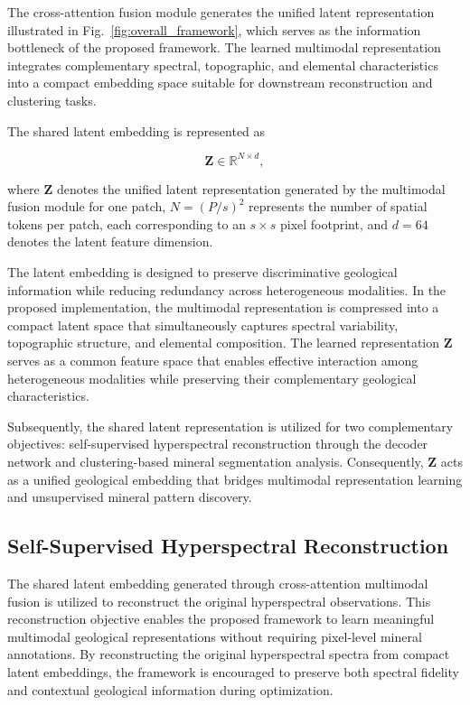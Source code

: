\documentclass[pdflatex,sn-mathphys-num]{sn-jnl}
\begin{document}
The cross-attention fusion module generates the unified latent representation illustrated in Fig.~\ref{fig:overall_framework}, which serves as the information bottleneck of the proposed framework. The learned multimodal representation integrates complementary spectral, topographic, and elemental characteristics into a compact embedding space suitable for downstream reconstruction and clustering tasks.

The shared latent embedding is represented as

\[
\mathbf{Z}\in\mathbb{R}^{N\times d},
\]

where $\mathbf{Z}$ denotes the unified latent representation generated by the multimodal fusion module for one patch, $N=(P/s)^2$ represents the number of spatial tokens per patch, each corresponding to an $s\times s$ pixel footprint, and $d=64$ denotes the latent feature dimension.

The latent embedding is designed to preserve discriminative geological information while reducing redundancy across heterogeneous modalities. In the proposed implementation, the multimodal representation is compressed into a compact latent space that simultaneously captures spectral variability, topographic structure, and elemental composition. The learned representation $\mathbf{Z}$ serves as a common feature space that enables effective interaction among heterogeneous modalities while preserving their complementary geological characteristics.

Subsequently, the shared latent representation is utilized for two complementary objectives: self-supervised hyperspectral reconstruction through the decoder network and clustering-based mineral segmentation analysis. Consequently, $\mathbf{Z}$ acts as a unified geological embedding that bridges multimodal representation learning and unsupervised mineral pattern discovery.

\subsection{Self-Supervised Hyperspectral Reconstruction}

The shared latent embedding generated through cross-attention multimodal fusion is utilized to reconstruct the original hyperspectral observations. This reconstruction objective enables the proposed framework to learn meaningful multimodal geological representations without requiring pixel-level mineral annotations. By reconstructing the original hyperspectral spectra from compact latent embeddings, the framework is encouraged to preserve both spectral fidelity and contextual geological information during optimization.
\end{document}
